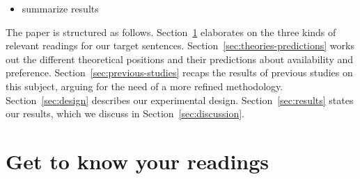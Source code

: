 \documentclass[fleqn,reqno,10pt,draft]{article}
\newcommand{\lc}{\acro{lc}}
\newcommand{\ec}{\acro{ec}}
\newcommand{\LC}{\lc}
\newcommand{\EC}{\ec}
\begin{document}

\medskip

\begin{itemize}
\item summarize results
\end{itemize}

The paper is structured as follows. Section~\ref{sec:get-know-your}
elaborates on the three kinds of relevant readings for our target
sentences. Section~\ref{sec:theories-predictions} works out the
different theoretical positions and their predictions about
availability and preference. Section~\ref{sec:previous-studies} recaps
the results of previous studies on this subject, arguing for the need
of a more refined methodology. Section~\ref{sec:design} describes our
experimental design. Section~\ref{sec:results} states our results,
which we discuss in Section~\ref{sec:discussion}.

\section{Get to know your readings}
\label{sec:get-know-your}
\end{document}
